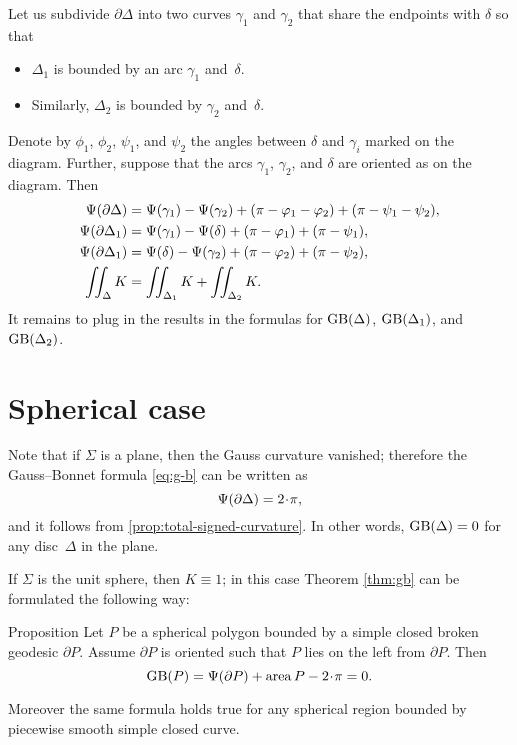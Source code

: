 Let us subdivide $\partial \Delta$ into two curves $\gamma_1$ and $\gamma_2$ that share the endpoints with $\delta$ so that
\begin{itemize}
\item $\Delta_1$ is bounded by an arc $\gamma_1$  and~$\delta$.
\item Similarly, $\Delta_2$ is bounded by $\gamma_2$ and~$\delta$.
\end{itemize}

Denote by $\phi_1$, $\phi_2$, $\psi_1$, and $\psi_2$ the angles between $\delta$ and $\gamma_i$ marked on the diagram.
Further, suppose that the arcs $\gamma_1$, $\gamma_2$, and $\delta$ are oriented as on the diagram. 
Then
\begin{align*}
\Psi({\partial \Delta})&= \Psi({\gamma_1})-\Psi({\gamma_2})+(\pi-\varphi_1-\varphi_2)+(\pi-\psi_1-\psi_2),
\\
\Psi({\partial \Delta_1})&= \Psi({\gamma_1})-\Psi({\delta})+(\pi-\varphi_1)+(\pi-\psi_1),
\\
\Psi({\partial \Delta_1})&= \Psi({\delta})-\Psi({\gamma_2})+(\pi-\varphi_2)+(\pi-\psi_2),
\\
\iint_\Delta K&=\iint_{\Delta_1} K+\iint_{\Delta_2} K.
\end{align*}
It remains to plug in the results in the formulas for $\mathop{\rm GB}\nolimits(\Delta)$, $\mathop{\rm GB}\nolimits(\Delta_1)$, and $\mathop{\rm GB}\nolimits(\Delta_2)$.
\qeds

\section{Spherical case}

Note that if $\Sigma$ is a plane, then the Gauss curvature vanished;
therefore the Gauss--Bonnet formula \ref{eq:g-b} can be written as 
\[\tgc{\partial\Delta}=2\cdot \pi,\]
and it follows from \ref{prop:total-signed-curvature}.
In other words, $\mathop{\rm GB}\nolimits(\Delta)=0$ for any disc~$\Delta$ in the plane.

If $\Sigma$ is the unit sphere, then $K\equiv1$;
in this case Theorem \ref{thm:gb} can be formulated the following way:

\begin{thm}{Proposition}\label{prop:area-of-spher-polygon}
Let $P$ be a spherical polygon bounded by a simple closed broken geodesic $\partial P$.
Assume $\partial P$ is oriented such that $P$ lies on the left from $\partial P$.
Then 
\[\GB(P)=\tgc{\partial P}+\area P-2\cdot \pi=0.\]

Moreover the same formula holds true for any spherical region bounded by piecewise smooth simple closed curve.
\end{thm}

